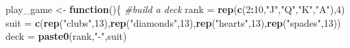 \documentclass[
]{book}
\newenvironment{Shaded}{\begin{snugshade}}{\end{snugshade}}
\newcommand{\CommentTok}[1]{\textcolor[rgb]{0.56,0.35,0.01}{\textit{#1}}}
\newcommand{\ControlFlowTok}[1]{\textcolor[rgb]{0.13,0.29,0.53}{\textbf{#1}}}
\newcommand{\DecValTok}[1]{\textcolor[rgb]{0.00,0.00,0.81}{#1}}
\newcommand{\FunctionTok}[1]{\textcolor[rgb]{0.13,0.29,0.53}{\textbf{#1}}}
\newcommand{\NormalTok}[1]{#1}
\newcommand{\OtherTok}[1]{\textcolor[rgb]{0.56,0.35,0.01}{#1}}
\newcommand{\SpecialCharTok}[1]{\textcolor[rgb]{0.81,0.36,0.00}{\textbf{#1}}}
\newcommand{\StringTok}[1]{\textcolor[rgb]{0.31,0.60,0.02}{#1}}
\theoremstyle{definition}
\theoremstyle{definition}
\theoremstyle{definition}
\theoremstyle{definition}
\theoremstyle{remark}
\begin{document}
\begin{Shaded}
\begin{Highlighting}[]
\NormalTok{play\_game }\OtherTok{\textless{}{-}} \ControlFlowTok{function}\NormalTok{()\{}
  \CommentTok{\#build a deck}
\NormalTok{  rank }\OtherTok{=} \FunctionTok{rep}\NormalTok{(}\FunctionTok{c}\NormalTok{(}\DecValTok{2}\SpecialCharTok{:}\DecValTok{10}\NormalTok{,}\StringTok{"J"}\NormalTok{,}\StringTok{"Q"}\NormalTok{,}\StringTok{"K"}\NormalTok{,}\StringTok{"A"}\NormalTok{),}\DecValTok{4}\NormalTok{)}
\NormalTok{  suit }\OtherTok{=} \FunctionTok{c}\NormalTok{(}\FunctionTok{rep}\NormalTok{(}\StringTok{"clubs"}\NormalTok{,}\DecValTok{13}\NormalTok{),}\FunctionTok{rep}\NormalTok{(}\StringTok{"diamonds"}\NormalTok{,}\DecValTok{13}\NormalTok{),}\FunctionTok{rep}\NormalTok{(}\StringTok{"hearts"}\NormalTok{,}\DecValTok{13}\NormalTok{),}\FunctionTok{rep}\NormalTok{(}\StringTok{"spades"}\NormalTok{,}\DecValTok{13}\NormalTok{))}
\NormalTok{  deck }\OtherTok{=} \FunctionTok{paste0}\NormalTok{(rank,}\StringTok{"{-}"}\NormalTok{,suit)}
  

\end{Highlighting}
\end{Shaded}
\end{document}
